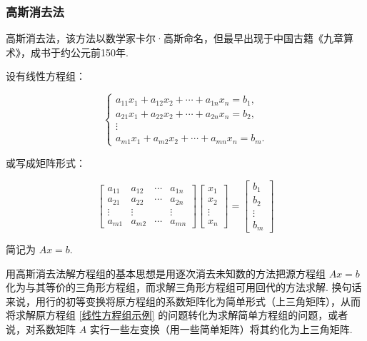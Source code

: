 \subsubsection{高斯消去法}

高斯消去法，该方法以数学家卡尔·高斯命名，但最早出现于中国古籍《九章算术》，成书于约公元前150年.

设有线性方程组：

\begin{equation}
    \left\{\begin{matrix}
        a_{11}x_1 + a_{12}x_2 + \cdots + a_{1n}x_n = b_1, \\
        a_{21}x_1 + a_{22}x_2 + \cdots + a_{2n}x_n = b_2, \\
        \vdots                                            \\
        a_{m1}x_1 + a_{m2}x_2 + \cdots + a_{mn}x_n = b_m.
    \end{matrix}\right.
    \label{线性方程组示例}
\end{equation}

或写成矩阵形式：

\begin{equation*}
    \begin{bmatrix}
        a_{11} & a_{12} & \cdots & a_{1n} \\
        a_{21} & a_{22} & \cdots & a_{2n} \\
        \vdots & \vdots &        & \vdots \\
        a_{m1} & a_{m2} & \cdots & a_{mn}
    \end{bmatrix}
    \begin{bmatrix}
        x_1    \\
        x_2    \\
        \vdots \\
        x_n
    \end{bmatrix}
    =
    \begin{bmatrix}
        b_1    \\
        b_2    \\
        \vdots \\
        b_m
    \end{bmatrix}
\end{equation*}

简记为 $Ax = b$.

用高斯消去法解方程组的基本思想是用逐次消去未知数的方法把源方程组 $Ax = b$ 化为与其等价的三角形方程组，而求解三角形方程组可用回代的方法求解. 换句话来说，用行的初等变换将原方程组的系数矩阵化为简单形式（上三角矩阵），从而将求解原方程组 \eqref{线性方程组示例} 的问题转化为求解简单方程组的问题，或者说，对系数矩阵 $A$ 实行一些左变换（用一些简单矩阵）将其约化为上三角矩阵.

